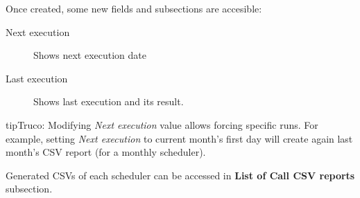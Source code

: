 \documentclass[letterpaper,10pt,spanish]{sphinxmanual}
\begin{document}
Once created, some new fields and subsections are accesible:
\begin{description}
\item[{Next execution}] \leavevmode{}\label{administration_portal/client/residential/calls/call_csv_schedulers:term-next-execution}
Shows next execution date

\item[{Last execution}] \leavevmode{}\label{administration_portal/client/residential/calls/call_csv_schedulers:term-last-execution}
Shows last execution and its result.

\end{description}

\begin{notice}{tip}{Truco:}
Modifying \emph{Next execution} value allows forcing specific runs. For example, setting \emph{Next execution} to
current month's first day will create again last month's CSV report (for a monthly scheduler).
\end{notice}

Generated CSVs of each scheduler can be accessed in \textbf{List of Call CSV reports} subsection.
\end{document}

